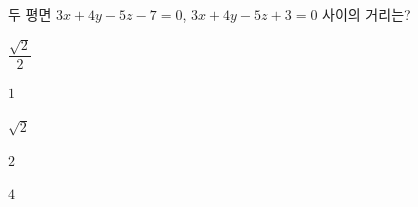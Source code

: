 두 평면 $3x+4y-5z-7=0$, $3x+4y-5z+3=0$ 사이의 거리는?
\begin{choices32}{\rule[-3ex]{0pt}{8ex}$\dfrac{\sqrt{2}}{2}$}{\rule[-3ex]{0pt}{8ex}$1$}{\rule[-3ex]{0pt}{8ex}$\sqrt{2}$}{\rule[-3ex]{0pt}{8ex}$2$}{\rule[-3ex]{0pt}{8ex}$4$}\end{choices32}
